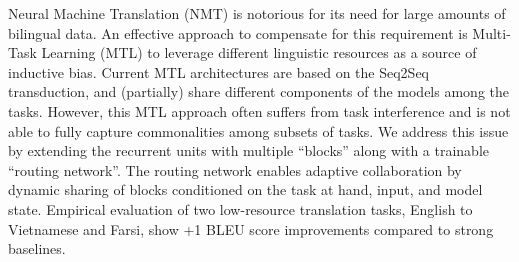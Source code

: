 Neural Machine Translation (NMT) is notorious for its need for large amounts of bilingual data. An effective approach to compensate for this requirement is Multi-Task Learning (MTL) to leverage different linguistic resources as a source of inductive bias. Current MTL architectures are based on the Seq2Seq transduction, and (partially) share different components of the models among the tasks. However, this MTL approach often suffers from task interference and is not able to fully capture commonalities among subsets of tasks. We address this issue by extending the recurrent units with multiple ``blocks'' along with a trainable ``routing network''. The routing network enables adaptive collaboration by dynamic  sharing of blocks conditioned on the task at hand, input, and model state. Empirical evaluation of two low-resource translation tasks, English to Vietnamese and Farsi, show +1 BLEU score improvements compared to strong baselines.
